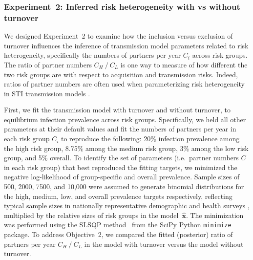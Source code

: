 \subsubsection{Experiment~2: Inferred risk heterogeneity with vs without turnover}
\label{sss:exp-infer}
We designed Experiment~2 to examine how
the inclusion versus exclusion of turnover influences
the inference of transmission model parameters related to risk heterogeneity,
specifically the numbers of partners per year $C_i$ across risk groups.
The ratio of partner numbers $C_H~/~C_L$
is one way to measure of how different the two risk groups are
with respect to acquisition and transmission risks.
Indeed, ratios of partner numbers are often used when parameterizing 
risk heterogeneity in STI transmission models \citep{Mishra2012}.
\par
First, we fit the transmission model with turnover and without turnover,
to equilibrium infection prevalence across risk groups.
Specifically, we held all other parameters at their default values and
fit the numbers of partners per year in each risk group $C_i$
to reproduce the following:
20\% infection prevalence among the high risk group,
8.75\% among the medium risk group,
3\% among the low risk group,
and 5\% overall.
To identify the set of parameters (i.e.\ partner numbers $C$ in each risk group)
that best reproduced the fitting targets, we minimized
the negative log-likelihood of group-specific and overall prevalence.
Sample sizes of 500, 2000, 7500, and 10,000 were assumed to generate binomial distributions
for the high, medium, low, and overall prevalence targets respectively,
reflecting typical sample sizes in
nationally representative demographic and health surveys \citep{DHS},
multiplied by the relative sizes of risk groups in the model~$\bm{\hat{x}}$.
The minimization was performed using
the SLSQP method~\citep{Kraft1988} from the SciPy Python
\href{https://docs.scipy.org/doc/scipy/reference/generated/scipy.optimize.minimize.html}
{\texttt{minimize}} package.
To address Objective~2, we compared
the fitted (posterior) ratio of partners per year $C_H~/~C_L$
in the model with turnover versus the model without turnover.

